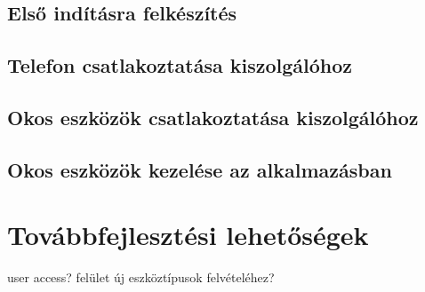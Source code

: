 \documentclass[
]{thesis-ekf}
\theoremstyle{definition}
\theoremstyle{remark}
\begin{document}
\section{Első indításra felkészítés}
\section{Telefon csatlakoztatása kiszolgálóhoz}
\section{Okos eszközök csatlakoztatása kiszolgálóhoz}
\section{Okos eszközök kezelése az alkalmazásban}

\chapter{Továbbfejlesztési lehetőségek}
user access? felület új eszköztípusok felvételéhez?

\begin{thebibliography}{2}
\end{thebibliography}
\end{document}
